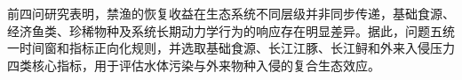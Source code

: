前四问研究表明，禁渔的恢复收益在生态系统不同层级并非同步传递，基础食源、经济鱼类、珍稀物种及系统长期动力学行为的响应存在明显差异。据此，问题五统一时间窗和指标正向化规则，并选取基础食源、长江江豚、长江鲟和外来入侵压力四类核心指标，用于评估水体污染与外来物种入侵的复合生态效应。